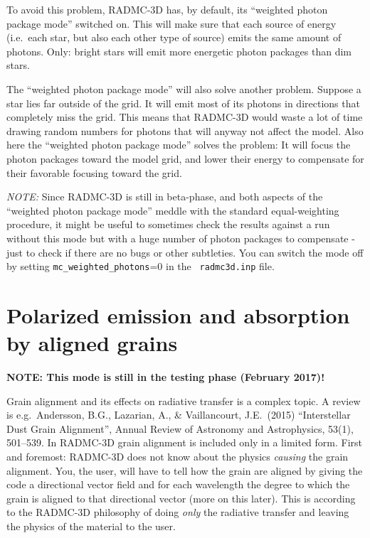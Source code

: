 \documentclass{report}
\begin{document}
To avoid this problem, RADMC-3D has, by default, its ``weighted photon
package mode'' switched on. This will make sure that each source of 
energy (i.e.\ each star, but also each other type of source) emits the
same amount of photons. Only: bright stars will emit more energetic
photon packages than dim stars. 

The ``weighted photon package mode'' will also solve another problem.
Suppose a star lies far outside of the grid. It will emit most of its
photons in directions that completely miss the grid. This means that
RADMC-3D would waste a lot of time drawing random numbers for photons that
will anyway not affect the model. Also here the ``weighted photon package
mode'' solves the problem: It will focus the photon packages toward the
model grid, and lower their energy to compensate for their favorable
focusing toward the grid.

{\em NOTE:} Since RADMC-3D is still in beta-phase, and both aspects of the
``weighted photon package mode'' meddle with the standard equal-weighting
procedure, it might be useful to sometimes check the results against a run
without this mode but with a huge number of photon packages to compensate -
just to check if there are no bugs or other subtleties. You can switch the
mode off by setting {\small\tt mc\_weighted\_photons}=0 in the {\small\tt
  radmc3d.inp} file.


\section{Polarized emission and absorption by aligned grains}
\label{sec-polarized-thermal-emission}
%
{\bf NOTE: This mode is still in the testing phase (February 2017)!}

Grain alignment and its effects on radiative transfer is a complex topic. A
review is e.g.~Andersson, B.G., Lazarian, A., \& Vaillancourt, J.E.\ (2015)
``Interstellar Dust Grain Alignment'', Annual Review of Astronomy and
Astrophysics, 53(1), 501–539. In RADMC-3D grain alignment is included only
in a limited form. First and foremost: RADMC-3D does not know about the
physics {\em causing} the grain alignment. You, the user, will have to tell
how the grain are aligned by giving the code a directional vector field and
for each wavelength the degree to which the grain is aligned to that
directional vector (more on this later). This is according to the RADMC-3D
philosophy of doing {\em only} the radiative transfer and leaving the
physics of the material to the user.
\end{document}
